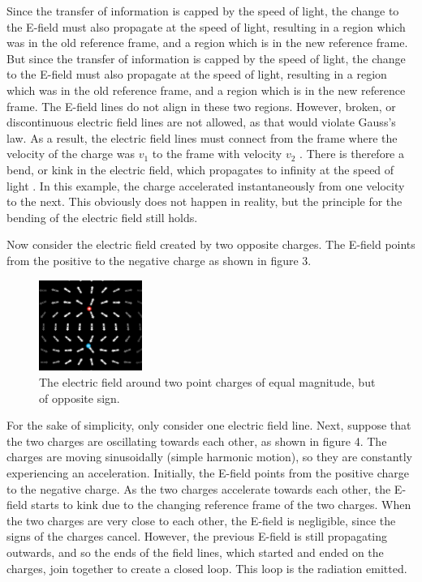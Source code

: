 \documentclass[12pt]{article}
\begin{document}
Since the transfer of information is capped by the speed of light, the change to the E-field must also propagate at the speed of light, resulting in a region which was in the old reference frame, and a region which is in the new reference frame. But since the transfer of information is capped by the speed of light, the change to the E-field must also propagate at the speed of light, resulting in a region which was in the old reference frame, and a region which is in the new reference frame. The E-field lines do not align in these two regions. However, broken, or discontinuous electric field lines are not allowed, as that would violate Gauss's law. As a result, the electric field lines must connect from the frame where the velocity of the charge was $v_1$ to the frame with velocity $v_2$ \cite{schroeder}. There is therefore a bend, or kink in the electric field, which propagates to infinity at the speed of light \cite{schroeder}. In this example, the charge accelerated instantaneously from one velocity to the next. This obviously does not happen in reality, but the principle for the bending of the electric field still holds.

Now consider the electric field created by two opposite charges. The E-field points from the positive to the negative charge as shown in figure 3. 

\begin{figure}[h]
    \centering
    \includegraphics[width=0.3\textwidth]{positive-negative-EField.png}
    \caption{The electric field around two point charges of equal magnitude, but of opposite sign.}
\end{figure} 

For the sake of simplicity, only consider one electric field line. Next, suppose that the two charges are oscillating towards each other, as shown in figure 4. The charges are moving sinusoidally (simple harmonic motion), so they are constantly experiencing an acceleration. Initially, the E-field points from the positive charge to the negative charge. As the two charges accelerate towards each other, the E-field starts to kink due to the changing reference frame of the two charges. When the two charges are very close to each other, the E-field is negligible, since the signs of the charges cancel. However, the previous E-field is still propagating outwards, and so the ends of the field lines, which started and ended on the charges, join together to create a closed loop. This loop is the radiation emitted.
\end{document}
